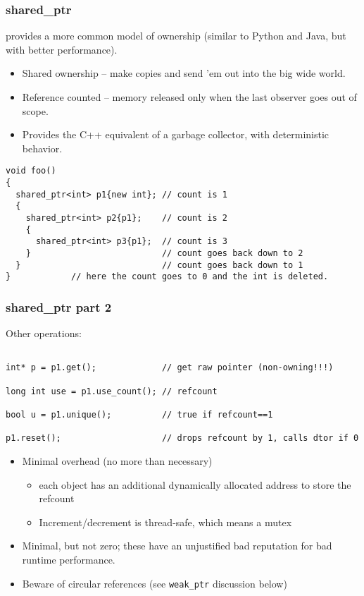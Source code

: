 \begin{frame}[fragile]
\frametitle{shared\_ptr}
 provides a more common model of ownership
(similar to Python and Java, but with better performance).

\begin{itemize}
\item Shared ownership -- make copies and send 'em out into the big wide
world.

\item Reference counted -- memory released only when the last observer
goes out of scope.

\item Provides the C++ equivalent of a garbage collector, with
  deterministic behavior.

\end{itemize}

{\scriptsize\begin{verbatim}
void foo() 
{  
  shared_ptr<int> p1{new int}; // count is 1
  {
    shared_ptr<int> p2{p1};    // count is 2
    {
      shared_ptr<int> p3{p1};  // count is 3
    }                          // count goes back down to 2
  }                            // count goes back down to 1
}            // here the count goes to 0 and the int is deleted.
\end{verbatim}}

\end{frame}



\begin{frame}[fragile]
\frametitle{shared\_ptr part 2}

Other operations:
{\scriptsize\begin{verbatim}

int* p = p1.get();             // get raw pointer (non-owning!!!)

long int use = p1.use_count(); // refcount

bool u = p1.unique();          // true if refcount==1

p1.reset();                    // drops refcount by 1, calls dtor if 0
\end{verbatim}
}



\begin{itemize}
\pause{}
\item Minimal overhead (no more than necessary)
\begin{itemize}
  \item each object has an additional dynamically allocated address to
    store the refcount
  \item Increment/decrement is thread-safe, which means a mutex
\end{itemize}
\vskip 6pt
\pause{}
\item Minimal, but not zero; these have an unjustified bad 
  reputation for bad runtime performance.
\vskip 6pt
\pause{}
\item Beware of circular references (see \texttt{weak\_ptr} discussion below)
\end{itemize}
\end{frame}

